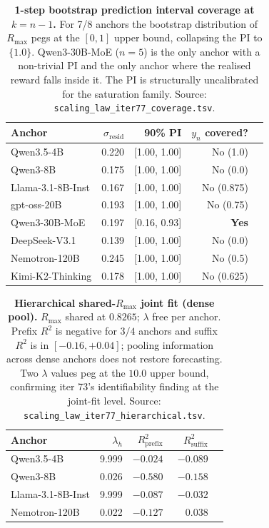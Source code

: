 \begin{table}[t]
  \centering
  \small
  \begin{tabular}{lrrrr}
    \toprule
    Anchor & $\sigma_\mathrm{resid}$ & 90\% PI & $y_{n}$ covered? \\
    \midrule
      Qwen3.5-4B            & 0.220 & [1.00, 1.00] & No (1.0) \\
      Qwen3-8B              & 0.175 & [1.00, 1.00] & No (0.0) \\
      Llama-3.1-8B-Inst     & 0.167 & [1.00, 1.00] & No (0.875) \\
      gpt-oss-20B           & 0.193 & [1.00, 1.00] & No (0.75) \\
      Qwen3-30B-MoE         & 0.197 & [0.16, 0.93] & \textbf{Yes} \\
      DeepSeek-V3.1         & 0.139 & [1.00, 1.00] & No (0.0) \\
      Nemotron-120B         & 0.245 & [1.00, 1.00] & No (0.5) \\
      Kimi-K2-Thinking      & 0.178 & [1.00, 1.00] & No (0.625) \\
    \bottomrule
  \end{tabular}
  \caption{\textbf{1-step bootstrap prediction interval coverage at
    $k = n-1$.}  For 7/8 anchors the bootstrap distribution of $R_\mathrm{max}$
    pegs at the $[0,1]$ upper bound, collapsing the PI to $\{1.0\}$.
    Qwen3-30B-MoE ($n=5$) is the only anchor with a non-trivial PI and the
    only anchor where the realised reward falls inside it.  The PI is
    structurally uncalibrated for the saturation family.
    Source: \texttt{scaling\_law\_iter77\_coverage.tsv}.}
  \label{tab:iter77-coverage}
\end{table}

\begin{table}[t]
  \centering
  \small
  \begin{tabular}{lrrrr}
    \toprule
    Anchor & $\lambda_h$ & $R^2_\mathrm{prefix}$ & $R^2_\mathrm{suffix}$ \\
    \midrule
      Qwen3.5-4B            & 9.999 & $-0.024$ & $-0.089$ \\
      Qwen3-8B              & 0.026 & $-0.580$ & $-0.158$ \\
      Llama-3.1-8B-Inst     & 9.999 & $-0.087$ & $-0.032$ \\
      Nemotron-120B         & 0.022 & $-0.127$ & $\phantom{-}0.038$ \\
    \bottomrule
  \end{tabular}
  \caption{\textbf{Hierarchical shared-$R_\mathrm{max}$ joint fit
    (dense pool).}  $R_\mathrm{max}$ shared at $0.8265$; $\lambda$
    free per anchor.  Prefix $R^2$ is negative for $3/4$ anchors and
    suffix $R^2$ is in $[-0.16, +0.04]$; pooling information across
    dense anchors does not restore forecasting.  Two $\lambda$ values
    peg at the $10.0$ upper bound, confirming iter 73's
    identifiability finding at the joint-fit level.
    Source: \texttt{scaling\_law\_iter77\_hierarchical.tsv}.}
  \label{tab:iter77-hierarchical}
\end{table}

